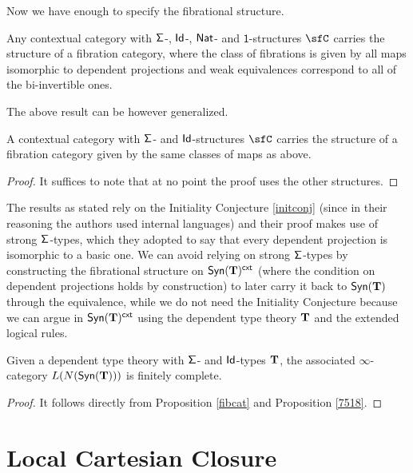 \noindent
Now we have enough to specify the fibrational structure.

\begin{prop}
  Any contextual category with $\operatorname{\mathsf{\Sigma}}$-, $\operatorname{\mathsf{Id}}$-, $\operatorname{\mathsf{Nat}}$- and
  $\mathsf{1}$-structures $\sfC$ carries the structure of a fibration category,
  where the class of fibrations is given by all maps isomorphic to dependent
  projections and weak equivalences correspond to all of the bi-invertible ones.
\end{prop}

\noindent
The above result can be however generalized.

\begin{prop}\label{fibcat}
  A contextual category with $\operatorname{\mathsf{\Sigma}}$- and $\operatorname{\mathsf{Id}}$-structures $\sfC$ carries
  the structure of a fibration category given by the same classes of maps as
  above.
\end{prop}
\begin{proof}
  It suffices to note that at no point the proof uses the other structures.
\end{proof}

\begin{rmk}
  The results as stated rely on the Initiality Conjecture \ref{initconj} (since
  in their reasoning the authors used internal languages) and their proof makes
  use of strong $\operatorname{\mathsf{\Sigma}}$-types, which they adopted to say that every dependent
  projection is isomorphic to a basic one. We
  can avoid relying on strong $\operatorname{\mathsf{\Sigma}}$-types by constructing the fibrational
  structure on $\mathsf{Syn}(\mathbf{T})^{\operatorname{\mathsf{cxt}}}$ (where the condition on dependent projections
  holds by construction) to later carry it back to $\mathsf{Syn}(\mathbf{T})$ through the
  equivalence, while we do not need the Initiality Conjecture because we can
  argue in $\mathsf{Syn}(\mathbf{T})^{\operatorname{\mathsf{cxt}}}$ using the dependent type theory $\operatorname{\mathbf{T}}$ and the
  extended logical rules.
\end{rmk}

\begin{cor}\label{fincompl1}
  Given a dependent type theory with $\operatorname{\mathsf{\Sigma}}$- and $\operatorname{\mathsf{Id}}$-types $\operatorname{\mathbf{T}}$, the
  associated $\infty$-category $L(N(\mathsf{Syn}(\mathbf{T})))$ is finitely complete.
\end{cor}
\begin{proof}
  It follows directly from Proposition \ref{fibcat} and Proposition \ref{7518}.
\end{proof}

\section{Local Cartesian Closure}

